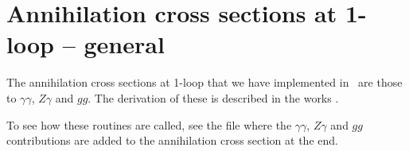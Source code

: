 
\section{Annihilation cross sections at 1-loop -- general }

The annihilation cross sections at 1-loop that we have implemented in
\ds\ are those to $\gamma \gamma$, $Z \gamma$ and $g g$. The
derivation of these is described in the works \cite{ggullio,zgullio}.

To see how these routines are called, see the file
 where the $\gamma \gamma$, $Z \gamma$
and $g g$ contributions are added to the annihilation cross section at
the end.

